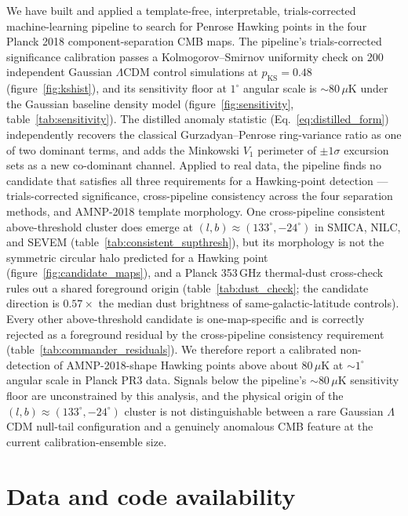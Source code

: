 \documentclass[a4paper,11pt]{article}
\begin{document}
We have built and applied a template-free, interpretable, trials-corrected machine-learning pipeline to search for Penrose Hawking points in the four Planck 2018 component-separation CMB maps. The pipeline's trials-corrected significance calibration passes a Kolmogorov--Smirnov uniformity check on 200 independent Gaussian $\Lambda$CDM control simulations at $p_{\text{KS}} = 0.48$ (figure~\ref{fig:kshist}), and its sensitivity floor at $1^\circ$ angular scale is $\sim 80\,\mu\mathrm{K}$ under the Gaussian baseline density model (figure~\ref{fig:sensitivity}, table~\ref{tab:sensitivity}). The distilled anomaly statistic (Eq.~\ref{eq:distilled_form}) independently recovers the classical Gurzadyan--Penrose ring-variance ratio as one of two dominant terms, and adds the Minkowski $V_1$ perimeter of $\pm 1\sigma$ excursion sets as a new co-dominant channel. Applied to real data, the pipeline finds no candidate that satisfies all three requirements for a Hawking-point detection --- trials-corrected significance, cross-pipeline consistency across the four separation methods, and AMNP-2018 template morphology. One cross-pipeline consistent above-threshold cluster does emerge at $(l, b) \approx (133^\circ, -24^\circ)$ in SMICA, NILC, and SEVEM (table~\ref{tab:consistent_supthresh}), but its morphology is not the symmetric circular halo predicted for a Hawking point (figure~\ref{fig:candidate_maps}), and a Planck 353\,GHz thermal-dust cross-check rules out a shared foreground origin (table~\ref{tab:dust_check}; the candidate direction is $0.57 \times$ the median dust brightness of same-galactic-latitude controls). Every other above-threshold candidate is one-map-specific and is correctly rejected as a foreground residual by the cross-pipeline consistency requirement (table~\ref{tab:commander_residuals}). We therefore report a calibrated non-detection of AMNP-2018-shape Hawking points above about $80\,\mu\mathrm{K}$ at $\sim 1^\circ$ angular scale in Planck PR3 data. Signals below the pipeline's $\sim 80\,\mu\mathrm{K}$ sensitivity floor are unconstrained by this analysis, and the physical origin of the $(l, b) \approx (133^\circ, -24^\circ)$ cluster is not distinguishable between a rare Gaussian $\Lambda$CDM null-tail configuration and a genuinely anomalous CMB feature at the current calibration-ensemble size.

\section*{Data and code availability}
\end{document}
